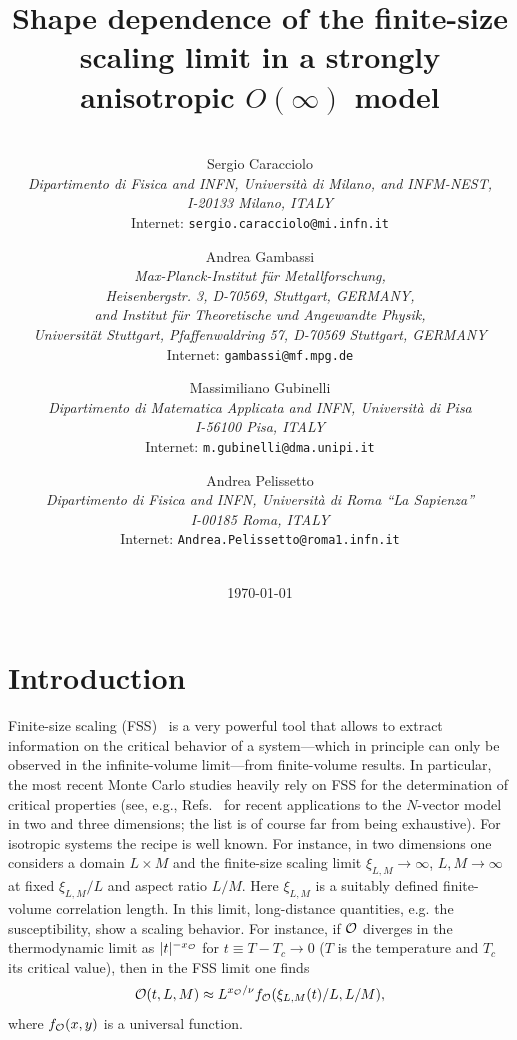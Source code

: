 \documentclass[a4paper,12pt]{article}
\title{Shape dependence of the finite-size scaling limit 
in a strongly anisotropic $O(\infty)$ model}
\author{
  \\
  { Sergio Caracciolo}              \\
  {\small\it Dipartimento di Fisica and INFN, Universit\`a di Milano, 
    and INFM-NEST, }  \\[-0.2cm]
  {\small\it I-20133 Milano, ITALY}          \\[-0.2cm]
  {\small Internet: {\tt sergio.caracciolo@mi.infn.it}}   
  \\[-0.1cm]  \and
  { Andrea Gambassi }              \\
  {\small\it Max-Planck-Institut f\"ur Metallforschung,}  \\[-0.2cm]
  {\small\it Heisenbergstr. 3, D-70569, Stuttgart, GERMANY,}      \\[-0.2cm]
  {\small\it and Institut f\"ur Theoretische und Angewandte Physik,} \\[-0.2cm]
  {\small\it Universit\"at Stuttgart, Pfaffenwaldring 57, 
       D-70569 Stuttgart, GERMANY} \\[-0.2cm]
  {\small Internet: {\tt gambassi@mf.mpg.de}}   
  \\[-0.1cm]  \and
  { Massimiliano Gubinelli}              \\
  {\small\it Dipartimento di Matematica Applicata  and INFN,
       Universit\`a di Pisa} \\[-0.2cm]
  {\small\it I-56100 Pisa, ITALY}          \\[-0.2cm]
  {\small Internet: {\tt m.gubinelli@dma.unipi.it}}   
  \\[-0.1cm]  \and
  { Andrea Pelissetto}              \\
  {\small\it Dipartimento di Fisica and INFN,
           Universit\`a di Roma ``La Sapienza''}        \\[-0.2cm]
  {\small\it I-00185 Roma, ITALY}          \\[-0.2cm]
  {\small Internet: {\tt Andrea.Pelissetto@roma1.infn.it}}   \\[-0.2cm]
  {\protect\makebox[5in]{\quad}}  %
  \\
}
\date{\today}
\begin{document}
\maketitle

\clearpage

\section{Introduction}

Finite-size scaling (FSS)~\cite{Fisher-71,Barber,Cardy-88,Privman-91} 
is a very powerful tool that allows to extract
information on the critical behavior of a system---which in
principle can only be observed in the infinite-volume limit---from
finite-volume results. In particular, the most recent Monte Carlo
studies heavily rely on FSS for the determination of critical
properties (see, e.g.,
Refs.~\cite{Binder-81,LWW-91,BLH-95,Caracciolo95,Caracciolo95b,%
HPV-99,BFMMPR-99,BST-99,CHPRV-02}
for recent applications to the $N$-vector model in two and three dimensions;
the list is of course far from being exhaustive). 
For isotropic systems the recipe is well
known. For instance, in two dimensions one considers a
domain $L\times M$ and the finite-size scaling 
limit $\xi_{L,M}\to\infty$, $L,M\to\infty$
at fixed $\xi_{L,M}/L$ and aspect ratio $L/M$. Here $\xi_{L,M}$ is
a suitably defined finite-volume correlation length. In this limit,
long-distance quantities, e.g. the susceptibility,
show a scaling behavior. For instance, if
$\cal O$ diverges in the thermodynamic limit
 as $|t|^{-x_{\cal O}}$ for $t\equiv T - T_c\to 0$
($T$ is the temperature and $T_c$ its critical value), then in the FSS
limit one finds
\begin{equation}
{\cal O}(t,L,M) \approx L^{x_{\cal O}/\nu} f_{\cal O} (\xi_{L,M}(t)/L,L/M),
\end{equation}
where $f_{\cal O}(x,y)$ is a universal function.
\end{document}
